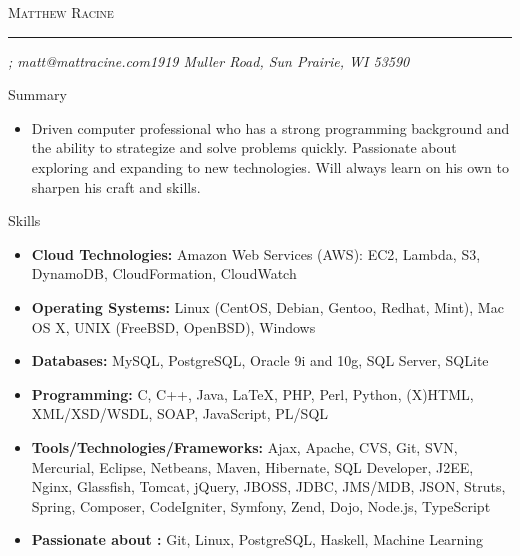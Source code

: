 \documentclass[11pt,oneside]{article}
\makeatletter
\newcommand{\name}{Matthew Racine}
\newcommand{\addr}{1919 Muller Road, Sun Prairie, WI 53590}
\newcommand{\phone}{}
\newcommand{\email}{matt@mattracine.com}
\newcommand{\bigname}[1]{
    \begin{center}\fontfamily{phv}\selectfont\Huge\scshape#1\end{center}
}
\newenvironment{ressection}[1]{
    \vspace{4pt}
    {\fontfamily{phv}\selectfont\Large#1}
    \begin{itemize}
    \vspace{3pt}
}{
    \end{itemize}
}
\newcommand{\resitem}[1]{
    \vspace{-4pt}
    \item \begin{flushleft} #1 \end{flushleft}
}
\makeatother
\begin{document}
 \selectfont

\bigname{\name}

\vspace{-8pt} \rule{\textwidth}{1pt}

\vspace{-1pt} {\small\itshape \phone ; \email \hfill \addr}

\vspace{8 pt}

\begin{ressection}{Summary}
    \resitem{Driven computer professional who has a strong programming background and the ability to strategize and solve problems quickly.  Passionate about exploring and expanding to new technologies. Will always learn on his own to sharpen his craft and skills.}
\end{ressection}


\begin{ressection}{Skills}

    \resitem{\textbf{Cloud Technologies:} Amazon Web Services (AWS): EC2, Lambda, S3, DynamoDB, CloudFormation, CloudWatch}
    \resitem{\textbf{Operating Systems:} Linux (CentOS, Debian, Gentoo, Redhat, Mint), Mac OS X, UNIX (FreeBSD, OpenBSD), Windows}
    \resitem{\textbf{Databases:} MySQL, PostgreSQL, Oracle 9i and 10g, SQL Server, SQLite}
    \resitem{\textbf{Programming:} C, C++, Java, \LaTeX, PHP, Perl, Python, (X)HTML, XML/XSD/WSDL, SOAP, JavaScript, PL/SQL}
    \resitem{\textbf{Tools/Technologies/Frameworks:} Ajax, Apache, CVS, Git, SVN, Mercurial, Eclipse, Netbeans, Maven, Hibernate, SQL Developer, J2EE, Nginx, Glassfish, Tomcat, jQuery, JBOSS, JDBC, JMS/MDB, JSON, Struts, Spring, Composer, CodeIgniter, Symfony, Zend, Dojo, Node.js, TypeScript}
    \resitem{\textbf{Passionate about :} Git, Linux, PostgreSQL, Haskell, Machine Learning}

\end{ressection}
\end{document}
